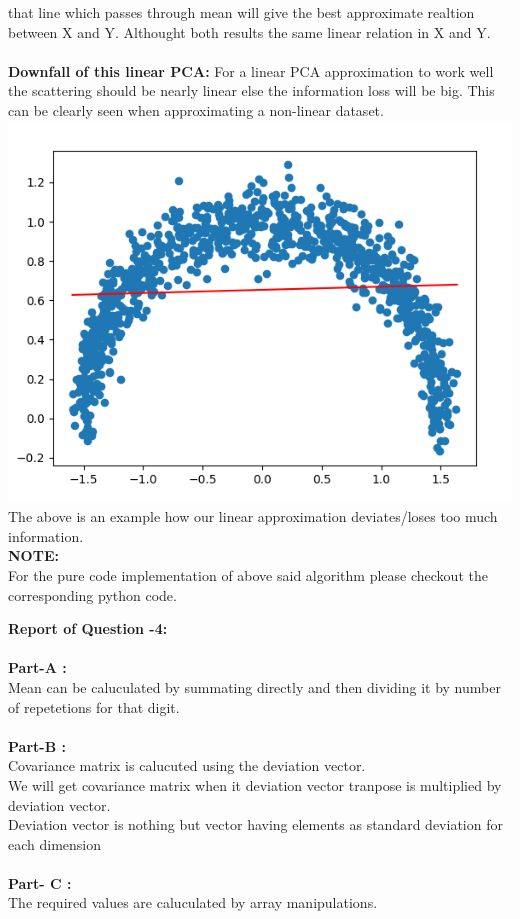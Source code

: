 \documentclass{article}
\begin{document}
    that line which passes through mean will give the best approximate realtion between X and Y. Althought both results
    the same linear relation in X and Y.
    \\
    \\
    \textbf{Downfall of this linear PCA:} For a linear PCA approximation to work well the scattering should be nearly
    linear else the information loss will be big. This can be clearly seen when approximating a non-linear dataset.\\
    \includegraphics[scale=.6]{../results/q3/q3partC.png}\\
    The above is an example how our linear approximation deviates/loses too much information.
    \\
    \textbf{NOTE:}\\
    For the pure code implementation of above said algorithm please checkout the corresponding python code.

\newpage
$$ $$
\textbf{\large {Report of Question -4:}} \\
    \\
    \textbf{Part-A :} \\
         Mean can be caluculated by summating directly and then dividing it by number of repetetions for that digit.
    \\ \\
    \textbf{Part-B :} \\
        Covariance matrix is calucuted using the deviation vector.\\
        We will get covariance matrix when it deviation vector tranpose is multiplied by deviation vector.\\
         Deviation vector is nothing but vector having elements as standard deviation for each dimension \\ \\
    \textbf{Part- C :} \\
         The required values are caluculated by array manipulations.
\end{document}
